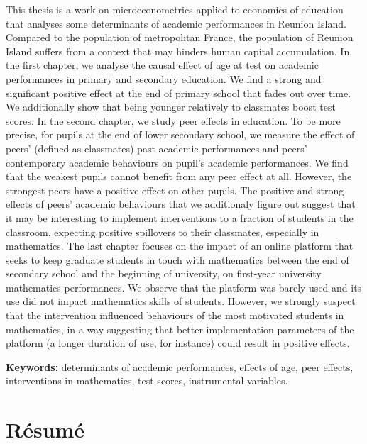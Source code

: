 \documentclass[
]{book}
\begin{document}
This thesis is a work on microeconometrics applied to economics of education that analyses some determinants of academic performances in Reunion Island. Compared to the population of metropolitan France, the population of Reunion Island suffers from a context that may hinders human capital accumulation. In the first chapter, we analyse the causal effect of age at test on academic performances in primary and secondary education. We find a strong and significant positive effect at the end of primary school that fades out over time. We additionally show that being younger relatively to classmates boost test scores. In the second chapter, we study peer effects in education. To be more precise, for pupils at the end of lower secondary school, we measure the effect of peers' (defined as classmates) past academic performances and peers' contemporary academic behaviours on pupil's academic performances. We find that the weakest pupils cannot benefit from any peer effect at all. However, the strongest peers have a positive effect on other pupils. The positive and strong effects of peers' academic behaviours that we additionaly figure out suggest that it may be interesting to implement interventions to a fraction of students in the classroom, expecting positive spillovers to their classmates, especially in mathematics. The last chapter focuses on the impact of an online platform that seeks to keep graduate students in touch with mathematics between the end of secondary school and the beginning of university, on first-year university mathematics performances. We observe that the platform was barely used and its use did not impact mathematics skills of students. However, we strongly suspect that the intervention influenced behaviours of the most motivated students in mathematics, in a way suggesting that better implementation parameters of the platform (a longer duration of use, for instance) could result in positive effects.

\textbf{Keywords: } determinants of academic performances, effects of age, peer effects, interventions in mathematics, test scores, instrumental variables.

\hypertarget{ruxe9sumuxe9}{%
\chapter*{Résumé}\label{ruxe9sumuxe9}}
\end{document}
